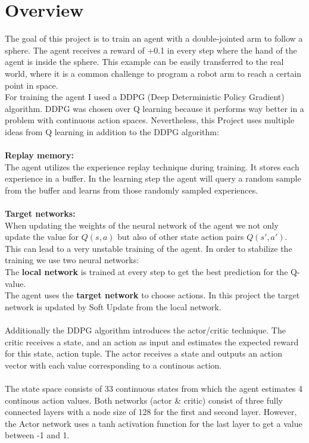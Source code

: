 \documentclass[12pt,a4paper]{article}
\begin{document}
    \section{Overview}\label{sec:overview}
    The goal of this project is to train an agent with a double-jointed arm to follow a sphere.
    The agent receives a reward of +0.1 in every step where the hand of the agent is inside the sphere.
    This example can be easily transferred to the real world, where it is a common challenge to program a robot arm to reach a certain point in space.
    \\
    For training the agent I used a DDPG (Deep Deterministic Policy Gradient) algorithm.
    DDPG was chosen over Q learning because it performs way better in a problem with continuous action spaces.
    Nevertheless, this Project uses multiple ideas from Q learning in addition to the DDPG algorithm:
    \\\\
    \textbf{Replay memory:}\\
    The agent utilizes the experience replay technique during training.
    It stores each experience in a buffer.
    In the learning step the agent will query a random sample from the buffer and learns from those randomly sampled experiences.
    \\\\
    \textbf{Target networks:}\\
    When updating the weights of the neural network of the agent we not only update the value for $Q(s,a)$ but also of other state action pairs $Q(s',a')$.
    This can lead to a very unstable training of the agent.
    In order to stabilize the training we use two neural networks: \\
    The \textbf{local network} is trained at every step to get the best prediction for the Q-value.\\
    The agent uses the \textbf{target network} to choose actions.
    In this project the target network is updated by Soft Update from the local network.
    \\\\
    Additionally the DDPG algorithm introduces the actor/critic technique.
    The critic receives a state, and an action as input and estimates the expected reward for this state, action tuple.
    The actor receives a state and outputs an action vector with each value corresponding to a continous action.
    \\\\
    The state space consists of 33 continuous states from which the agent estimates 4 continous action values.
    Both networks (actor \& critic) consist of three fully connected layers with a node size of 128 for the first and second layer.
    However, the Actor network uses a tanh activation function for the last layer to get a value between -1 and 1.
\end{document}
